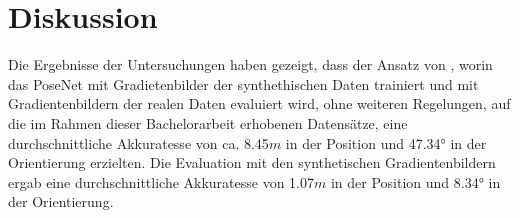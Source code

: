 
\section{Diskussion}
\label{sec:kapitel_5}
Die Ergebnisse der Untersuchungen haben gezeigt, dass der Ansatz von \citet{acharyaBIMPoseNetIndoorCamera2019}, worin das PoseNet mit Gradietenbilder der synthethischen Daten trainiert und mit Gradientenbildern der realen Daten evaluiert wird, ohne weiteren Regelungen, auf die im Rahmen dieser Bachelorarbeit erhobenen Datensätze, eine durchschnittliche Akkuratesse von ca. 8.45$m$ in der Position und 47.34° in der Orientierung erzielten. Die Evaluation mit den synthetischen Gradientenbildern ergab eine durchschnittliche Akkuratesse von 1.07$m$ in der Position und 8.34° in der Orientierung.